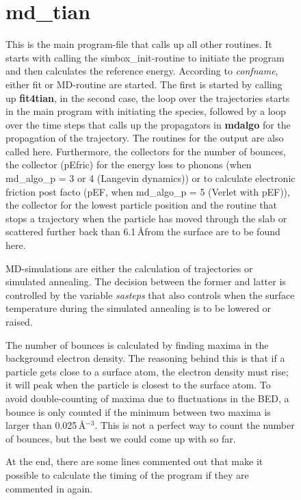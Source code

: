 \documentclass[twoside, 11pt, titlepage, captions=nooneline, a4paper, headsepline]{scrbook}%
\newcommand{\9}{\mathrm}
\newcommand{\0}{\,\mathrm}
\begin{document}
\begin{figure}[b!]
\begin{table}[b!]
\begin{tabular}{l p{12cm}}
\hline
\hline
\end{tabular}
\end{table}

\section{md\_tian}
This is the main program-file that calls up all other routines. It starts with calling the simbox\_init-routine to initiate the program and then calculates the reference energy. According to \textit{confname}, either fit or MD-routine are started. The first is started by calling up \textbf{fit4tian}, in the second case, the loop over the trajectories starts in the main program with initiating the species, followed by a loop over the time steps that calls up the propagators in \textbf{mdalgo} for the propagation of the trajectory. The routines for the output are also called here. Furthermore, the collectors for the number of bounces, the collector (pEfric) for the energy loss to phonons (when md\_algo\_p = 3 or 4 (Langevin dynamics)) or to calculate electronic friction post facto (pEF, when md\_algo\_p = 5 (Verlet with pEF)), the collector for the lowest particle position and the routine that stops a trajectory when the particle has moved through the slab or scattered further back than 6.1\,\AA from the surface are to be found here.

MD-simulations are either the calculation of trajectories or simulated annealing. The decision between the former and latter is controlled by the variable \textit{sasteps} that also controls when the surface temperature during the simulated annealing is to be lowered or raised.

The number of bounces is calculated by finding maxima in the background electron density. The reasoning behind this is that if a particle gets close to a surface atom, the electron density must rise; it will peak when the particle is closest to the surface atom. To avoid double-counting of maxima due to fluctuations in the BED, a bounce is only counted if the minimum between two maxima is larger than 0.025\,\AA$^{-3}$. This is not a perfect way to count the number of bounces, but the best we could come up with so far.

At the end, there are some lines commented out that make it possible to calculate the timing  of the program if they are commented in again.


\end{figure}
\end{document}
